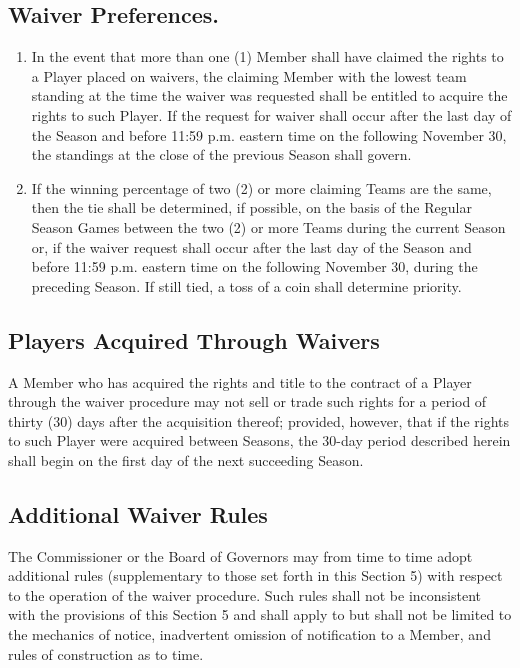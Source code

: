 \documentclass[]{book}
\providecommand{\tightlist}{%
  \setlength{\itemsep}{0pt}\setlength{\parskip}{0pt}}
\begin{document}
\hypertarget{waiver-preferences.}{%
\subsection{Waiver Preferences.}\label{waiver-preferences.}}

\begin{enumerate}
\def\labelenumi{(\alph{enumi})}
\tightlist
\item
  In the event that more than one (1) Member shall have claimed the rights to a Player placed on waivers, the claiming Member with the lowest team standing at the time the waiver was requested shall be entitled to acquire the rights to such Player. If the request for waiver shall occur after the last day of the Season and before 11:59 p.m. eastern time on the following November 30, the standings at the close of the previous Season shall govern.
\item
  If the winning percentage of two (2) or more claiming Teams are the same, then the tie shall be determined, if possible, on the basis of the Regular Season Games between the two (2) or more Teams during the current Season or, if the waiver request shall occur after the last day of the Season and before 11:59 p.m. eastern time on the following November 30, during the preceding Season. If still tied, a toss of a coin shall determine priority.
\end{enumerate}

\hypertarget{players-acquired-through-waivers}{%
\subsection{Players Acquired Through Waivers}\label{players-acquired-through-waivers}}

A Member who has acquired the rights and title to the contract of a Player through the waiver procedure may not sell or trade such rights for a period of thirty (30) days after the acquisition thereof; provided, however, that if the rights to such Player were acquired between Seasons, the 30-day period described herein shall begin on the first day of the next succeeding Season.

\hypertarget{additional-waiver-rules}{%
\subsection{Additional Waiver Rules}\label{additional-waiver-rules}}

The Commissioner or the Board of Governors may from time to time adopt additional rules (supplementary to those set forth in this Section 5) with respect to the operation of the waiver procedure. Such rules shall not be inconsistent with the provisions of this Section 5 and shall apply to but shall not be limited to the mechanics of notice, inadvertent omission of notification to a Member, and rules of construction as to time.
\end{document}
